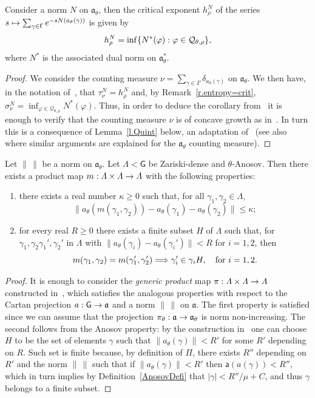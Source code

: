 \documentclass[AHL,Unicode,longabstracts,MathTools]{cedram}
\newcommand{\cartan}{a}
\renewcommand{\sf}[1]{{\mathsf{#1}}}
\newcommand{\sroot}{{\sf{a}}}
\newcommand{\sfG}{\sf{G}}
\newcommand{\G}{\sf{\Gamma}}
\newcommand{\calQ}{\mathcal{Q}}
\newcommand{\g}{\gamma}
\renewcommand{\t}{\theta}
\newcommand{\grupo}{\varLambda}
\renewcommand{\/}{\backslash}
\newcommand{\<}{\langle}
\renewcommand{\>}{\rangle}
\renewcommand{\a}{\mathfrak{a}}
\renewcommand*{\to}{\mathchoice{\longrightarrow}{\rightarrow}{\rightarrow}{\rightarrow}}
\let\oldmapsto\mapsto
\renewcommand*{\mapsto}{\mathchoice{\longmapsto}{\oldmapsto}{\oldmapsto}{\oldmapsto}}
\renewcommand*{\implies}{\mathchoice{\Longrightarrow}{\Rightarrow}{\Rightarrow}{\Rightarrow}}
\let\originalleft\left
\let\originalright\right
\renewcommand{\left}{\mathopen{}\mathclose\bgroup\originalleft}
\renewcommand{\right}{\aftergroup\egroup\originalright}
\begin{document}
\begin{coro}\label{quintgrowththeta}
Consider a norm $N$ on $\a_\t$, then the critical exponent $h^N_\rho$ of the series $s\mapsto\sum_{\g\in\G}e^{-sN(\cartan_\t(\g))}$ is given by
\[
h^N_\rho=\inf\left\{N^*(\varphi):\varphi\in\calQ_{\t,\rho}\right\},
\]
where $N^*$ is the associated dual norm on $\a_\t^*$.
\end{coro}

\begin{proof}
We consider the counting measure $\nu=\sum_{\g\in\G}\delta_{\cartan_\t(\g)}$ on $\a_\t$. We then have, in the notation of~\cite[Section~3]{Quint-Div}, that $\tau^N_\nu=h^N_\rho$ and, by Remark~\ref{r.entropy=crit}, $\sigma^N_\nu=\inf_{\varphi\in\calQ_{\t,\rho}}N^*(\varphi)$. Thus, in order to deduce the corollary from~\cite[Proposition~3.3.3]{Quint-Div} it is enough to verify that the counting measure $\nu$ is of concave growth as in~\cite[Section~3.2]{Quint-Div}. In turn this is a consequence of Lemma~\ref{l.Quint} below, an adaptation of~\cite[Proposition~2.3.1]{Quint-Div} (see also~\cite[Lemma~3.8]{KimOhWang}
where similar arguments are explained for the $\a_\t$ counting measure).
\end{proof}

\begin{lemm}\label{l.Quint}
Let $\|\,\|$ be a norm on $\a_\t$. Let $\grupo<\sfG$ be Zariski-dense and $\t$-Anosov. Then there exists a product map $m:\grupo\times\grupo\to\grupo$ with the following properties:
\begin{enumerate}
\item\label{lemm4.16.1} there exists a real number $\kappa\geq 0$ such that, for all $\g_1,\g_2\in\grupo$,
\[
\bigl\|\cartan_\t(m(\g_1,\g_2))-\cartan_\t(\g_1)-\cartan_\t(\g_2)\bigr\|\leq\kappa;
\]
\item\label{lemm4.16.2} for every real $R\geq 0$ there exists a finite subset $H$ of $\grupo$ such that, for $\g_1,\g_2\g_1',\g_2'$ in $\grupo$ with $\|\cartan_\t(\g_i)-\cartan_\t(\g_i')\|<R$ for $i=1,2$, then
\[
m(\g_1,\g_2)=m(\g_1',\g_2') \implies \g_i'\in\g_i H, \quad\text{for }i=1,2.
\]
\end{enumerate}
\end{lemm}

\begin{proof}
It is enough to consider the \emph{generic product} map $\pi:\grupo\times\grupo\to\grupo$ constructed in~\cite[Proposition~2.3.1]{Quint-Div}, which satisfies the analogous properties with respect to the Cartan projection $\cartan:\sfG\to\a$ and a norm $\|\,\|$ on $\a$. The first property is satisfied since we can assume that the projection $\pi_\theta:\a\to \a_\t$ is norm non-increasing. The second follows from the Anosov property: by the construction in~\cite[Proposition~2.3.1]{Quint-Div} one can choose $H$ to be the set of elements $\g$ such that $\|\cartan_\t(\g)\|<R'$ for some $R'$ depending on $R$. Such set is finite because, by definition of $\Pi$, there exists $R''$ depending on $R'$ and the norm $\|\,\|$ such that if $\|\cartan_\t(\g)\|<R'$ then $\sroot(\cartan(\gamma))<R''$, which in turn implies by Definition~\ref{AnosovDefi} that $|\gamma|<R''/\mu+C$, and thus $\g$ belongs to a finite subset.
\end{proof}
\end{document}

